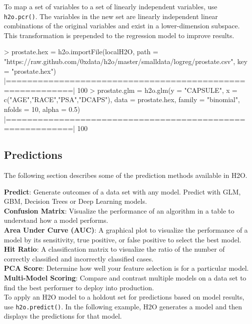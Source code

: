 \documentclass[11pt]{article}
\begin{document}
\begin{enumerate}
To map a set of variables to a set of linearly independent variables, use {\texttt{h2o.pcr()}}. The variables in the new set are linearly independent linear combinations of the original variables and exist in a lower-dimension subspace. This transformation is prepended to the regression model to improve results. 
\begin{spverbatim}


> prostate.hex = h2o.importFile(localH2O, path =
  "https://raw.github.com/0xdata/h2o/master/smalldata/logreg/prostate.csv",
  key = "prostate.hex")
  |==========================================================| 100%
> prostate.glm = h2o.glm(y = "CAPSULE", x =
c("AGE","RACE","PSA","DCAPS"), data = prostate.hex,
family = "binomial", nfolds = 10, alpha = 0.5)
    |==========================================================| 100%
\end{spverbatim}


\subsection{Predictions}

The following section describes some of the prediction methods available in H2O. 

\textbf{Predict}: Generate outcomes of a data set with any model. Predict with GLM, GBM, Decision Trees or Deep Learning models.\\

\textbf{Confusion Matrix}: Visualize the performance of an algorithm in a table to understand how a model performs.\\

\textbf{Area Under Curve (AUC)}: A graphical plot to visualize the performance of a model by its sensitivity, true positive, or false positive to select the best model.\\

\textbf{Hit Ratio}: A classification matrix to visualize the ratio of the number of correctly classified and incorrectly classified cases.\\

\textbf{PCA Score}: Determine how well your feature selection is for a particular model.\\

\textbf{Multi-Model Scoring}: Compare and contrast multiple models on a data set to find the best performer to deploy into production.\\

To apply an H2O model to a holdout set for predictions based on model results, use {\texttt{h2o.predict()}}.  In the following example, H2O generates a model and then displays the predictions for that model. 
\begin{spverbatim}


\end{spverbatim}
\end{enumerate}
\end{document}
